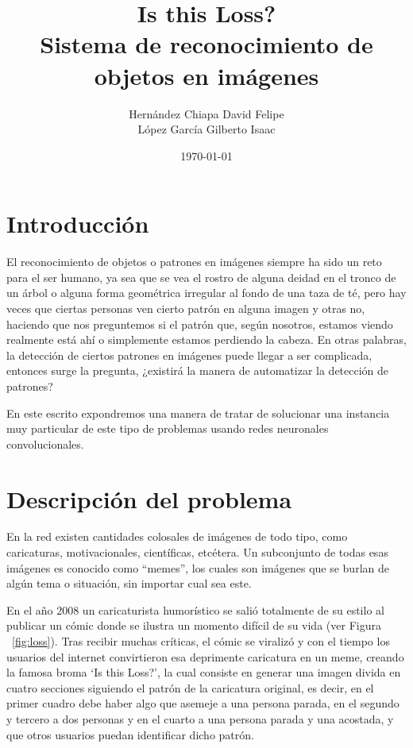 \documentclass[spanish,11pt,letterpaper]{article}
\title{{\Huge Is this Loss?}\\
Sistema de reconocimiento de objetos en imágenes}
\author{Hernández Chiapa David Felipe\\
López García Gilberto Isaac}
\affil{Facultad de Ciencias\\Universidad Nacional Autónoma de México}
\date{\small\today}
\begin{document}
\maketitle

\section{Introducción}

El reconocimiento de objetos o patrones en imágenes siempre ha sido un reto para el ser humano, ya sea que se
vea el rostro de alguna deidad en el tronco de un árbol o alguna forma geométrica irregular al fondo de una taza
de té, pero hay veces que ciertas personas ven cierto patrón en alguna imagen y otras no, haciendo que nos
preguntemos si el patrón que, según nosotros, estamos viendo realmente está ahí o simplemente estamos perdiendo la cabeza. En otras
palabras, la detección de ciertos patrones en imágenes puede llegar a ser complicada, entonces surge la
pregunta, ¿existirá la manera de automatizar la detección de patrones?

En este escrito expondremos una manera de tratar de solucionar una instancia muy particular de este tipo de problemas usando redes neuronales convolucionales.

\section{Descripción del problema}

En la red existen cantidades colosales de imágenes de todo tipo, como caricaturas, motivacionales, científicas,
etcétera. Un subconjunto de todas esas imágenes es conocido como ``memes'', los cuales son imágenes que se burlan
de algún tema o situación, sin importar cual sea este.

En el año 2008 un caricaturista humorístico se salió totalmente de su estilo al
publicar un cómic donde se ilustra un momento difícil de su vida (ver Figura ~\ref{fig:loss}).
Tras recibir muchas críticas, el cómic se viralizó y con el tiempo los usuarios del internet
convirtieron esa deprimente caricatura en un meme, creando la famosa broma
`Is this Loss?'\cite{loss},
la cual consiste en generar una imagen divida en cuatro secciones siguiendo el patrón de la
caricatura original, es decir, en el primer cuadro debe haber algo que asemeje a una persona parada, en el
segundo y tercero a dos personas y en el cuarto a una persona parada y una acostada, y que otros
usuarios puedan identificar dicho patrón.
\end{document}
